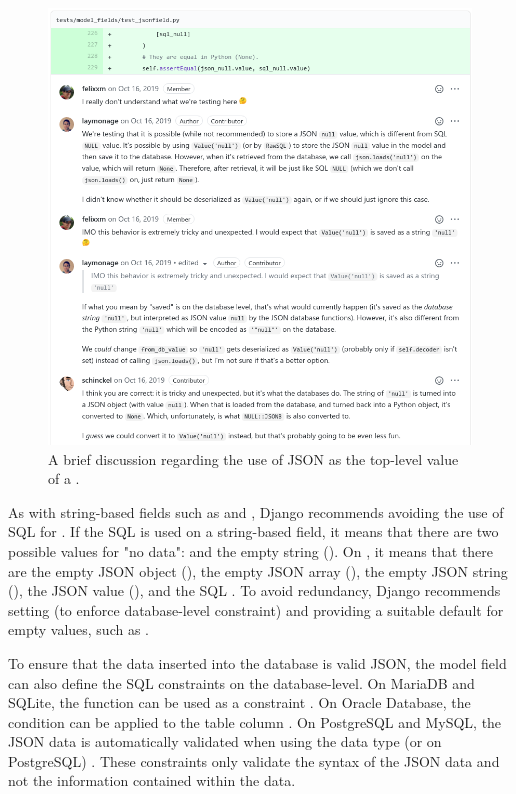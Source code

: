 \begin{figure}
	\centering
    \includegraphics[width=1.0\textwidth]{pics/null_discussion.png}
	\caption{A brief discussion regarding the use of JSON  as the
	top-level value of a .}
	\label{fig:nulldiscussion}
\end{figure}

As with string-based fields such as  and ,
Django recommends avoiding the use of SQL  for 
\cite{django:model_fields}. If the SQL  is used on a string-based
field, it means that there are two possible values for "no data": 
and the empty string (). On , it means that there are
the empty JSON object (), the empty JSON array (), the
empty JSON string (), the JSON  value (),
and the SQL . To avoid redundancy, Django recommends setting
 (to enforce database-level  constraint) and
providing a suitable default for empty values, such as .

To ensure that the data inserted into the database is valid JSON, the model
field can also define the SQL  constraints on the database-level.
On MariaDB and SQLite, the  function can be used as a
 constraint \cite{mariadb:json_valid, sqlite:json1}. On Oracle
Database, the  condition can be applied to the table column
\cite{oracle:is_json}. On PostgreSQL and MySQL, the JSON data is automatically
validated when using the  data type (or  on PostgreSQL)
\cite{postgres:json, mysql:json}. These constraints only validate the syntax of
the JSON data and not the information contained within the data.

